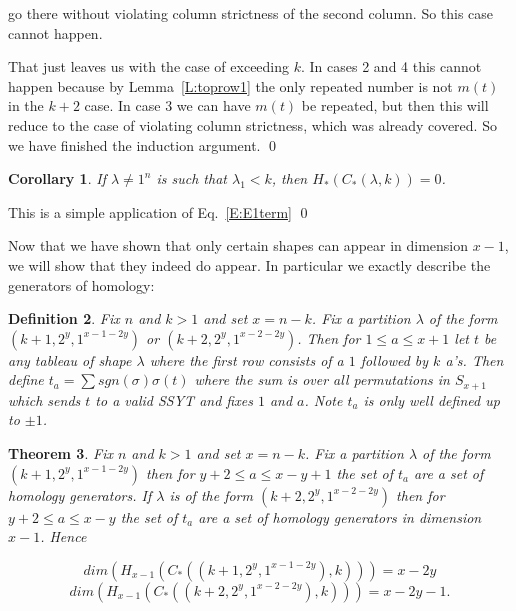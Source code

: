 \documentclass{elsart}
\newtheorem{theorem}{Theorem}[section]
\newtheorem{definition}[theorem]{Definition}
\newtheorem{corollary}[theorem]{Corollary}
\begin{document}
\begin{pf}
  go there without violating column strictness of the second column. So this case cannot happen.

  That just leaves us with the case of exceeding $k$. In cases 2 and 4 this cannot happen because by Lemma~\ref{L:toprow1} 
  the only repeated number is not $m(t)$ in the $k+2$ case. In case 3 we can have $m(t)$ be repeated,
  but then this will reduce to the case of violating column strictness, which was already covered. So we have finished the induction
  argument.
\qed
\end{pf}

\begin{corollary} \label{C:firstcolumn}
  If $ \lambda \ne 1^n $ is such that $\lambda_1 < k$, then $H_*(C_*(\lambda, k))=0$.
\end{corollary}
\begin{pf}
  This is a simple application of Eq.~\ref{E:E1term}
\qed
\end{pf}

Now that we have  shown that only certain shapes can appear in dimension $x-1$, we will show that they indeed do appear.
In particular we exactly describe the generators of homology:


\begin{definition} Fix $n$ and $k > 1$ and set $x=n-k$. Fix a partition $\lambda$ of the form $(k+1, 2^y, 1^{x-1-2y})$ or 
$(k+2, 2^y, 1^{x-2-2y})$. Then for $1 \le a \le x+1$ let $t$ be any tableau of shape $\lambda$ where the first row consists of a $1$ 
followed by $k$ a's. Then define $t_a = \sum sgn ( \sigma ) \sigma (t)$ where the sum is over all permutations in $S_{x+1}$ which 
sends $t$
to a valid SSYT and fixes $1$ and $a$. Note $t_a$ is only well defined up to $\pm 1$.
\end{definition}

\begin{theorem} Fix $n$ and $k > 1$ and set $x=n-k$. Fix a partition $\lambda$ of the form $(k+1, 2^y, 1^{x-1-2y})$ then for $y+2 \le a \le
  x-y+1$ the set of $t_a$ are a set of homology generators. If $\lambda$ is of the form $(k+2, 2^y, 1^{x-2-2y})$ then for $y+2 \le a \le 
  x-y$ the set of $t_a$ are a set of homology generators in dimension $x-1$. Hence

  \begin{equation}\label{E:dim1}
    dim(H_{x-1}(C_*((k+1, 2^y, 1^{x-1-2y}),k) )) = x-2y
  \end{equation}
  \begin{equation}\label{E:dim2}
    dim(H_{x-1}( C_*((k+2, 2^y, 1^{x-2-2y}),k) )) = x-2y-1.
  \end{equation}

\end{theorem}
\end{document}
